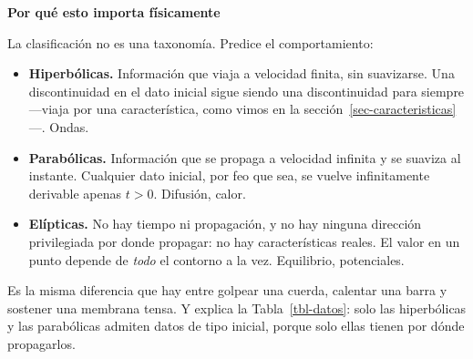 \documentclass[
  spanish,
  a4paper,
]{scrbook}
\providecommand{\tightlist}{%
  \setlength{\itemsep}{0pt}\setlength{\parskip}{0pt}}
\theoremstyle{definition}
\theoremstyle{plain}
\theoremstyle{definition}
\theoremstyle{plain}
\theoremstyle{definition}
\theoremstyle{remark}
\begin{document}
\begin{tcolorbox}[enhanced jigsaw, arc=.35mm, bottomrule=.15mm, breakable, colback=white, colframe=quarto-callout-important-color-frame, left=2mm, leftrule=.75mm, opacityback=0, rightrule=.15mm, toprule=.15mm]
\begin{minipage}[t]{5.5mm}
\textcolor{quarto-callout-important-color}{\faExclamation}
\end{minipage}%
\begin{minipage}[t]{\textwidth - 5.5mm}

\vspace{-3mm}\textbf{Por qué esto importa físicamente}\vspace{3mm}

La clasificación no es una taxonomía. Predice el comportamiento:

\begin{itemize}
\tightlist
\item
  \textbf{Hiperbólicas.} Información que viaja a velocidad finita, sin
  suavizarse. Una discontinuidad en el dato inicial sigue siendo una
  discontinuidad para siempre ---viaja por una característica, como
  vimos en la sección~\ref{sec-caracteristicas}---. Ondas.
\item
  \textbf{Parabólicas.} Información que se propaga a velocidad infinita
  y se suaviza al instante. Cualquier dato inicial, por feo que sea, se
  vuelve infinitamente derivable apenas \(t>0\). Difusión, calor.
\item
  \textbf{Elípticas.} No hay tiempo ni propagación, y no hay ninguna
  dirección privilegiada por donde propagar: no hay características
  reales. El valor en un punto depende de \emph{todo} el contorno a la
  vez. Equilibrio, potenciales.
\end{itemize}

Es la misma diferencia que hay entre golpear una cuerda, calentar una
barra y sostener una membrana tensa. Y explica la Tabla~\ref{tbl-datos}:
solo las hiperbólicas y las parabólicas admiten datos de tipo inicial,
porque solo ellas tienen por dónde propagarlos.

\end{minipage}%
\end{tcolorbox}
\end{document}
